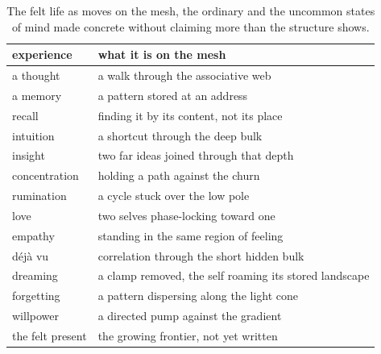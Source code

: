 \begin{table}[ht]
\centering
\small
\begin{tabular}{@{}ll@{}}
\toprule
experience & what it is on the mesh \\
\midrule
a thought & a walk through the associative web \\
a memory & a pattern stored at an address \\
recall & finding it by its content, not its place \\
intuition & a shortcut through the deep bulk \\
insight & two far ideas joined through that depth \\
concentration & holding a path against the churn \\
rumination & a cycle stuck over the low pole \\
love & two selves phase-locking toward one \\
empathy & standing in the same region of feeling \\
d\'ej\`a vu & correlation through the short hidden bulk \\
dreaming & a clamp removed, the self roaming its stored landscape \\
forgetting & a pattern dispersing along the light cone \\
willpower & a directed pump against the gradient \\
the felt present & the growing frontier, not yet written \\
\bottomrule
\end{tabular}
\caption{The felt life as moves on the mesh, the ordinary and the uncommon states of mind made concrete without claiming more than the structure shows.}
\label{tab:felt}
\end{table}
